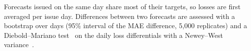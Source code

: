 Forecasts issued on the same day share most of their targets, so losses are first averaged per
issue day. Differences between two forecasts are assessed with a bootstrap over days (95\%
interval of the MAE difference, 5{,}000 replicates) and a Diebold--Mariano
test~\cite{diebold1995comparing} on the daily loss differentials with a Newey--West
variance~\cite{newey1987simple}.
